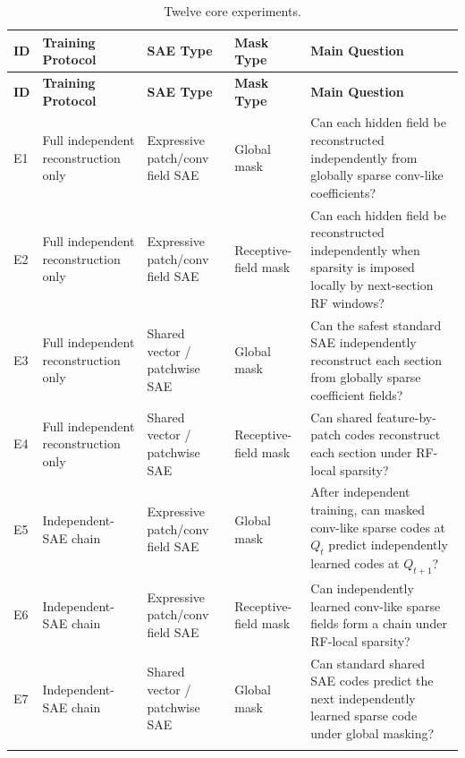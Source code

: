 \documentclass[11pt]{article}
\begin{document}
\begin{longtable}{p{}p{}p{}p{}p{}}
\caption{Twelve core experiments.}\\
\toprule
\textbf{ID} & \textbf{Training Protocol} & \textbf{SAE Type} & \textbf{Mask Type} & \textbf{Main Question}\\
\midrule
\endfirsthead
\toprule
\textbf{ID} & \textbf{Training Protocol} & \textbf{SAE Type} & \textbf{Mask Type} & \textbf{Main Question}\\
\midrule
\endhead

E1 & Full independent reconstruction only & Expressive patch/conv field SAE & Global mask & Can each hidden field be reconstructed independently from globally sparse conv-like coefficients?\\
\addlinespace

E2 & Full independent reconstruction only & Expressive patch/conv field SAE & Receptive-field mask & Can each hidden field be reconstructed independently when sparsity is imposed locally by next-section RF windows?\\
\addlinespace

E3 & Full independent reconstruction only & Shared vector / patchwise SAE & Global mask & Can the safest standard SAE independently reconstruct each section from globally sparse coefficient fields?\\
\addlinespace

E4 & Full independent reconstruction only & Shared vector / patchwise SAE & Receptive-field mask & Can shared feature-by-patch codes reconstruct each section under RF-local sparsity?\\
\addlinespace

E5 & Independent-SAE chain & Expressive patch/conv field SAE & Global mask & After independent training, can masked conv-like sparse codes at \(Q_t\) predict independently learned codes at \(Q_{t+1}\)?\\
\addlinespace

E6 & Independent-SAE chain & Expressive patch/conv field SAE & Receptive-field mask & Can independently learned conv-like sparse fields form a chain under RF-local sparsity?\\
\addlinespace

E7 & Independent-SAE chain & Shared vector / patchwise SAE & Global mask & Can standard shared SAE codes predict the next independently learned sparse code under global masking?\\
\addlinespace


\end{longtable}
\end{document}
